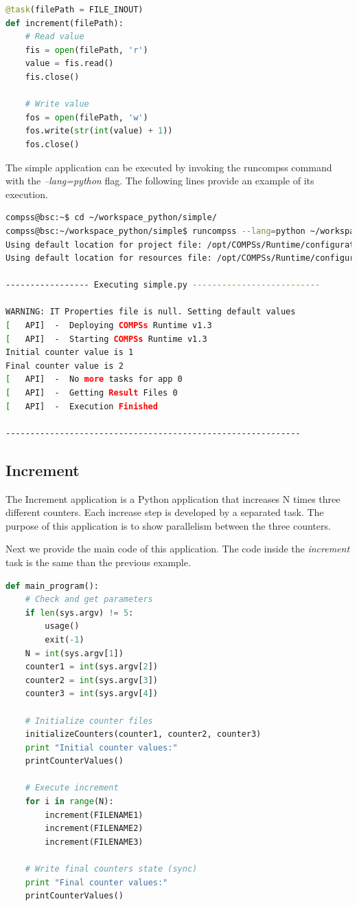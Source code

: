 \begin{lstlisting}[language=python]
@task(filePath = FILE_INOUT)
def increment(filePath):
    # Read value
    fis = open(filePath, 'r')
    value = fis.read()
    fis.close()

    # Write value
    fos = open(filePath, 'w')
    fos.write(str(int(value) + 1))
    fos.close()
\end{lstlisting}

The simple application can be executed by invoking the runcompss command with the \textit{--lang=python} flag. The following lines provide
an example of its execution.

\begin{lstlisting}[language=bash]
compss@bsc:~$ cd ~/workspace_python/simple/
compss@bsc:~/workspace_python/simple$ runcompss --lang=python ~/workspace_python/simple/simple.py 1
Using default location for project file: /opt/COMPSs/Runtime/configuration/xml/projects/project.xml
Using default location for resources file: /opt/COMPSs/Runtime/configuration/xml/resources/resources.xml

----------------- Executing simple.py --------------------------

WARNING: IT Properties file is null. Setting default values
[   API]  -  Deploying COMPSs Runtime v1.3 
[   API]  -  Starting COMPSs Runtime v1.3
Initial counter value is 1
Final counter value is 2
[   API]  -  No more tasks for app 0
[   API]  -  Getting Result Files 0
[   API]  -  Execution Finished

------------------------------------------------------------
\end{lstlisting}

\subsection{Increment}
The Increment application is a Python application that increases N times three different counters. Each increase step is developed by a separated task. The
purpose of this application is to show parallelism between the three counters.

Next we provide the main code of this application. The code inside the \textit{increment} task is the same than the previous example. 

\begin{lstlisting}[language=python]
 def main_program():
    # Check and get parameters
    if len(sys.argv) != 5:
        usage()
        exit(-1)
    N = int(sys.argv[1])
    counter1 = int(sys.argv[2])
    counter2 = int(sys.argv[3])
    counter3 = int(sys.argv[4])

    # Initialize counter files
    initializeCounters(counter1, counter2, counter3)
    print "Initial counter values:"
    printCounterValues()

    # Execute increment
    for i in range(N):
        increment(FILENAME1)
        increment(FILENAME2)
        increment(FILENAME3)

    # Write final counters state (sync)
    print "Final counter values:"
    printCounterValues()
\end{lstlisting}

